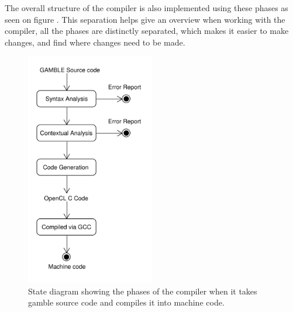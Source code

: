 The overall structure of the compiler is also implemented using these phases as seen on figure .
This separation helps give an overview when working with the compiler, all the phases are distinctly separated, which makes it easier to make changes, and find where changes need to be made.

\begin{figure}[ht]
\centering
\includegraphics[width=0.5\textwidth]{figures/ClassDiagrams/CompilerDiagram.pdf}
\caption{State diagram showing the phases of the compiler when it takes \gls{gamble} source code and compiles it into machine code.}\label{fig:phases}
\end{figure}

